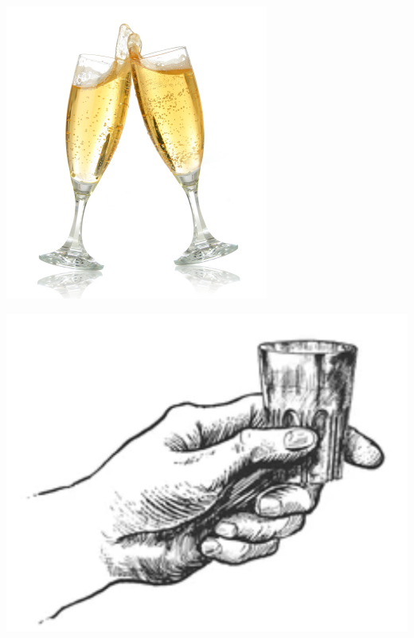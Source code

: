 \documentclass[10pt, a4paper]{article}
\begin{document}
\pagebreak
{}
\begin{multicols}{2}


\begin{flushleft}



\includegraphics[scale=.40]{kuvat/skal.jpg}







%

\pagebreak





\vspace{0.3cm}

\includegraphics[scale=.1, center]{kuvat/shot.png}


\end{flushleft}
\end{multicols}
\end{document}
